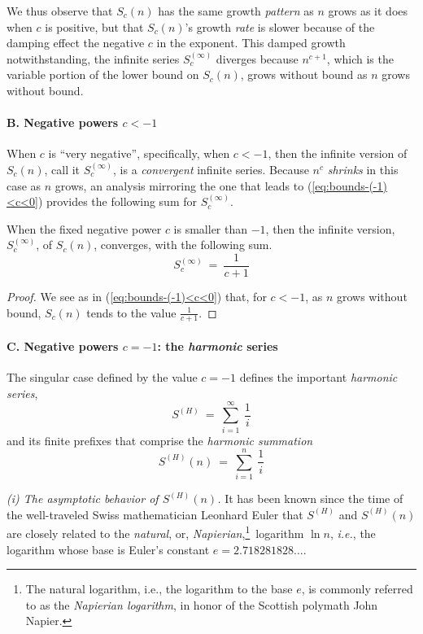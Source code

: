 We thus observe that $S_c(n)$ has the same growth {\em pattern} as $n$
grows as it does when $c$ is positive, but that $S_c(n)$'s growth {\em
  rate} is slower because of the damping effect the negative $c$ in
the exponent.  This damped growth notwithstanding, the infinite series
$S_c^{(\infty)}$ diverges because $n^{c+1}$, which is the variable
portion of the lower bound on $S_c(n)$, grows without bound as $n$
grows without bound.

\paragraph{B. Negative powers $c < -1$}

When $c$ is ``very negative'', specifically, when $c < -1$, then the
infinite version of $S_c(n)$, call it $S_c^{(\infty)}$, is a {\em
  convergent} infinite series.  Because $n^c$ {\em shrinks} in this
case as $n$ grows, an analysis mirroring the one that leads to
(\ref{eq:bounds-(-1)<c<0}) provides the following sum for $S_c^{(\infty)}$.

\begin{prop}
\label{thm:bounds-negative-(not-1)-sum-xc}
When the fixed negative power $c$ is smaller than $-1$, then the
infinite version, $S_c^{(\infty)}$, of $S_c(n)$, converges, with the
following sum.
\begin{equation}
\label{eq:bounds-negative-(not-1)-sum-xc}
S_c^{(\infty)} \ = \ \frac{1}{c+1}
\end{equation}
\end{prop}

\begin{proof}
We see as in (\ref{eq:bounds-(-1)<c<0}) that, for $c<-1$, as $n$ grows
without bound, $S_c(n)$ tends to the value ${\displaystyle
  \frac{1}{c+1}}$.
\end{proof}

\paragraph{C. Negative powers $c = -1$: the {\em harmonic} series}

The singular case defined by the value $c = -1$ defines the important
{\it harmonic series},
\[ S^{(H)} \ = \ \sum_{i=1}^\infty \ \frac{1}{i} \]
and its finite prefixes that comprise the {\it harmonic summation}
\[ S^{(H)}(n) \ = \ \sum_{i=1}^n \ \frac{1}{i} \]


{\it (i) The asymptotic behavior of $S^{(H)}(n)$.}
%
It has been known since the time of the well-traveled Swiss
mathematician Leonhard Euler  that $S^{(H)}$
and $S^{(H)}(n)$ are closely related to the {\em natural}, or,
{\it Napierian},\footnote{The natural logarithm, i.e., the logarithm
  to the base $e$, is commonly referred to as the {\it Napierian
    logarithm}, in honor of the Scottish polymath John
  Napier.}~logarithm $\ln n$, \textit{i.e.}, the logarithm whose base is
Euler's constant  $e = 2.718281828 \ldots$.

